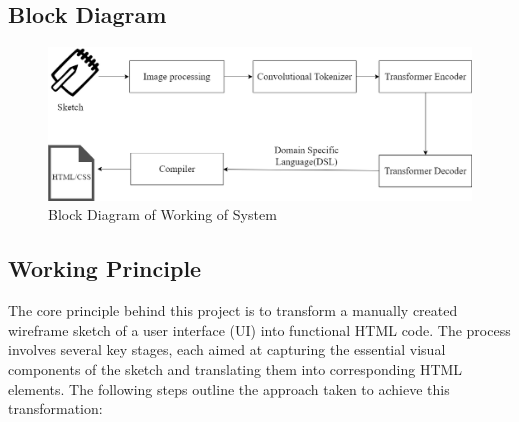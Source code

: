     \subsection{Block Diagram}

 \begin{figure}[H]
        \includegraphics[scale=5]{images/Block Diagram.png}
        \caption{Block Diagram of Working of System}
        \label{fig:block}
    \end{figure}

    \subsection{Working Principle}
    The core principle behind this project is to transform a manually created wireframe sketch of a user interface (UI) into functional HTML code. The process involves several key stages, each aimed at capturing the essential visual components of the sketch and translating them into corresponding HTML elements. The following steps outline the approach taken to achieve this transformation:

